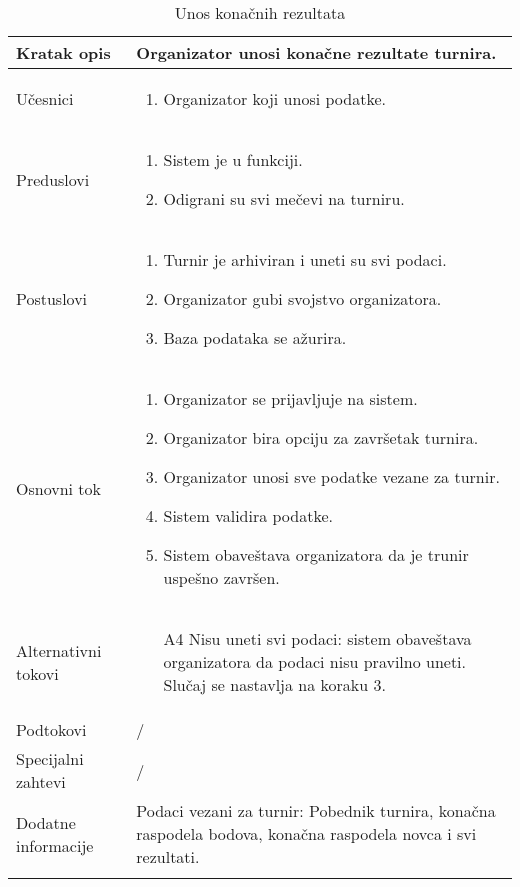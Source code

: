 \documentclass{article}
\begin{document}
\begin{longtable}{| p{} | p{} |} 
\hline
    Kratak opis & Organizator unosi konačne rezultate turnira.\\ 
\hline    
    Učesnici & \begin{enumerate}
        \item Organizator koji unosi podatke.
    \end{enumerate}
    \\
\hline
   Preduslovi & \begin{enumerate}
       \item Sistem je u funkciji.
       \item Odigrani su svi mečevi na turniru.
   \end{enumerate}\\
\hline  
    Postuslovi & \begin{enumerate}
        \item Turnir je arhiviran i uneti su svi podaci.
        \item Organizator gubi svojstvo organizatora.
        \item Baza podataka se ažurira.
    \end{enumerate}\\
\hline
    Osnovni tok & \begin{enumerate}
        \item Organizator se prijavljuje na sistem.
        \item Organizator bira opciju za završetak turnira.
        \item Organizator unosi sve podatke vezane za turnir.
        \item Sistem validira podatke.
        \item Sistem obaveštava organizatora da je trunir uspešno završen.
    \end{enumerate}\\
\hline
    Alternativni tokovi & \begin{enumerate}
        \item [A4] Nisu uneti svi podaci: sistem obaveštava organizatora da podaci nisu pravilno uneti. Slučaj se nastavlja na koraku 3.
    \end{enumerate}\\
\hline
    Podtokovi & /\\
\hline
    Specijalni zahtevi & /\\
\hline
    Dodatne informacije & Podaci vezani za turnir: Pobednik turnira, konačna raspodela bodova, konačna raspodela novca i svi rezultati. \\
\hline

\caption{Unos konačnih rezultata}
\end{longtable}
\end{document}
